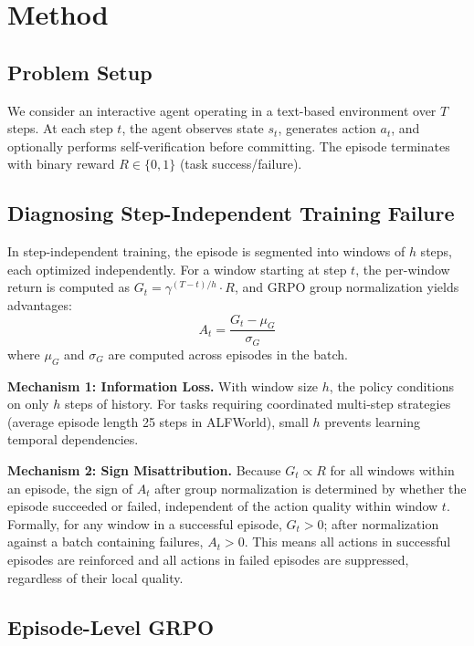 \documentclass[11pt]{article}
\begin{document}
\section{Method}

\subsection{Problem Setup}

We consider an interactive agent operating in a text-based environment over $T$ steps. At each step $t$, the agent observes state $s_t$, generates action $a_t$, and optionally performs self-verification before committing. The episode terminates with binary reward $R \in \{0, 1\}$ (task success/failure).

\subsection{Diagnosing Step-Independent Training Failure}

In step-independent training, the episode is segmented into windows of $h$ steps, each optimized independently. For a window starting at step $t$, the per-window return is computed as $G_t = \gamma^{(T-t)/h} \cdot R$, and GRPO group normalization yields advantages:
\begin{equation}
A_t = \frac{G_t - \mu_G}{\sigma_G}
\end{equation}
where $\mu_G$ and $\sigma_G$ are computed across episodes in the batch.

\textbf{Mechanism 1: Information Loss.} With window size $h$, the policy conditions on only $h$ steps of history. For tasks requiring coordinated multi-step strategies (average episode length 25 steps in ALFWorld), small $h$ prevents learning temporal dependencies.

\textbf{Mechanism 2: Sign Misattribution.} Because $G_t \propto R$ for all windows within an episode, the sign of $A_t$ after group normalization is determined by whether the episode succeeded or failed, independent of the action quality within window $t$. Formally, for any window in a successful episode, $G_t > 0$; after normalization against a batch containing failures, $A_t > 0$. This means all actions in successful episodes are reinforced and all actions in failed episodes are suppressed, regardless of their local quality.

\subsection{Episode-Level GRPO}
\end{document}
